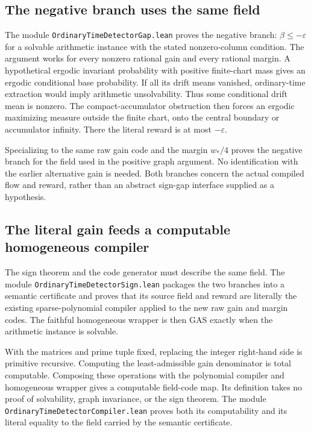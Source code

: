 \documentclass[11pt]{article}
\newcommand{\code}[1]{{\small\nolinkurl{#1}}}
\begin{document}
\subsection{The negative branch uses the same field}

The module \code{OrdinaryTimeDetectorGap.lean} proves the negative branch:
$\beta\le-\varepsilon$ for a solvable arithmetic instance with the stated
nonzero-column condition. The argument works for every nonzero rational
gain and every rational margin. A hypothetical ergodic invariant
probability with positive finite-chart mass gives an ergodic conditional
base probability. If all its drift means vanished, ordinary-time
extraction would imply arithmetic unsolvability. Thus some conditional
drift mean is nonzero. The compact-accumulator obstruction then forces
an ergodic maximizing measure outside the finite chart, onto the central
boundary or accumulator infinity. There the literal reward is at most
$-\varepsilon$.

Specializing to the same raw gain code and the margin $w_*/4$ proves
the negative branch for the field used in the positive graph argument.
No identification with the earlier alternative gain is needed. Both
branches concern the actual compiled flow and reward, rather than an
abstract sign-gap interface supplied as a hypothesis.

\subsection{The literal gain feeds a computable homogeneous compiler}

The sign theorem and the code generator must describe the same field.
The module \code{OrdinaryTimeDetectorSign.lean} packages the two branches
into a semantic certificate and proves that its source field and reward
are literally the existing sparse-polynomial compiler applied to the
new raw gain and margin codes. The faithful homogeneous wrapper is then
GAS exactly when the arithmetic instance is solvable.

With the matrices and prime tuple fixed, replacing the integer
right-hand side is primitive recursive. Computing the least-admissible
gain denominator is total computable. Composing these operations with
the polynomial compiler and homogeneous wrapper gives a computable
field-code map. Its definition takes no proof of solvability, graph
invariance, or the sign theorem. The module
\code{OrdinaryTimeDetectorCompiler.lean} proves both its computability
and its literal equality to the field carried by the semantic certificate.
\end{document}
